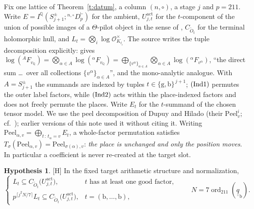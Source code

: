 \documentclass[11pt]{article}
\theoremstyle{plain}
\theoremstyle{definition}
\newtheorem{hypothesis}{Hypothesis}
\newcommand{\Ind}[1]{\textup{(Ind#1)}}
\newcommand{\ord}{\operatorname{ord}}
\begin{document}
Fix one lattice of Theorem~\ref{t:datum}, a column $(n,\circ)$,
a stage $j$ and $p=211$.  Write $E=I^{\mathbb{Q}}(S^\pm_{j+1};
{}^{n,\circ}D^\vdash_p)$ for the ambient, $U^{\mathrm{act}}_{j,t}$ for the
$t$-component of the union of possible images of a $\Theta$-pilot object in the
sense of \cite[Cor.~3.12]{IUT3}, $C_{\widetilde O_t}$ for the terminal
holomorphic hull, and $L_t=\bigotimes_i\log\mathcal{O}_{K_{t_i}}^\times$.  The source writes the tuple
decomposition explicitly: \cite[Prop.~3.1]{IUT3} gives
$\log({}^AF_{v_{\mathbb{Q}}})=\bigotimes_{\alpha\in A}\log({}^\alpha F_{v_{\mathbb{Q}}})
=\bigoplus_{\{v^\alpha\}_{\alpha\in A}}\bigotimes_{\alpha\in A}\log({}^\alpha F_{v^\alpha})$,
``the direct sum \dots\ over all collections $\{v^\alpha\}_{\alpha\in A}$'', and
\cite[Prop.~3.2]{IUT3} the mono-analytic analogue.  With $A=S^\pm_{j+1}$ the
summands are indexed by tuples $t\in\{\mathrm{g},\mathrm{b}\}^{\,j+1}$; $\Ind1$
permutes the outer label factors, while $\Ind2$ acts within the
place-indexed factors and does not freely permute the places.
Write $E_t$ for the $t$-summand of the chosen tensor model.
We use the peel decomposition of Dupuy and Hilado \cite[\S3.8]{DH20} (their
$\mathrm{Peel}^i_v$; cf.\ \cite[\S6.3]{DH}); earlier versions of this note
used it without citing it.
Writing $\mathrm{Peel}_{\alpha,v}=\bigoplus_{t\,:\,t_\alpha=v}E_t$, a whole-factor
permutation satisfies $T_\sigma(\mathrm{Peel}_{\alpha,v})
=\mathrm{Peel}_{\sigma(\alpha),v}$: \emph{the place is unchanged and only the
position moves}.  In particular a coefficient is never re-created at the target
slot.

\begin{hypothesis}\label{h:sa}
\textup{[H]} In the fixed target arithmetic structure and normalization,
\[
\begin{cases}
 L_t\subseteq C_{\widetilde O_t}\bigl(U^{\mathrm{act}}_{j,t}\bigr),
   & \text{$t$ has at least one good factor},\\[2pt]
 p^{\lceil j^2N/7\rceil}L_t\subseteq C_{\widetilde O_t}\bigl(U^{\mathrm{act}}_{j,t}\bigr),
   & t=(\mathrm{b},\dots,\mathrm{b}),
\end{cases}
\qquad N=7\ord_{211}(\underline{\underline q}_{\mathrm{b}}).
\]
\end{hypothesis}
\end{document}
